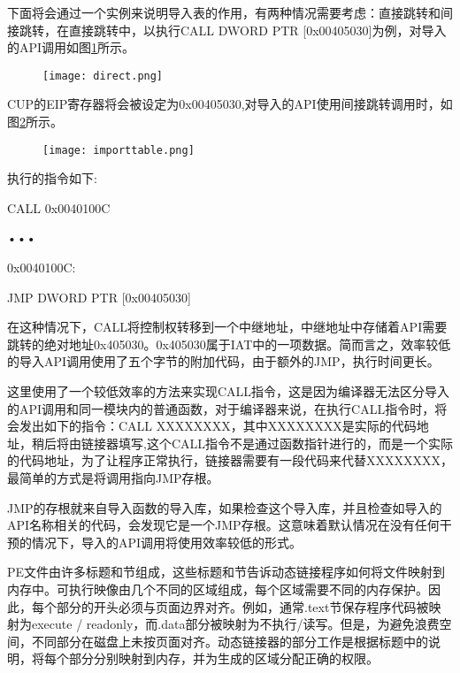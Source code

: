 下面将会通过一个实例来说明导入表的作用，有两种情况需要考虑：直接跳转和间接跳转，在直接跳转中，以执行CALL DWORD PTR [0x00405030]为例，对导入的API调用如图\ref{sec2:subsec3:direct}所示。

\begin{figure}[htbp]
	\centering
	\texttt{[image: direct.png]}\\
	\label{sec2:subsec3:direct}
\end{figure}

CUP的EIP寄存器将会被设定为0x00405030,对导入的API使用间接跳转调用时，如图\ref{sec2:subsec3:importtable}所示。

\begin{figure}[htbp]
	\centering
	\texttt{[image: importtable.png]}\\
	\label{sec2:subsec3:importtable}
\end{figure}

执行的指令如下:

CALL 0x0040100C

•••

0x0040100C:

JMP       DWORD PTR [0x00405030]

在这种情况下，CALL将控制权转移到一个中继地址，中继地址中存储着API需要跳转的绝对地址0x405030。0x405030属于IAT中的一项数据。简而言之，效率较低的导入API调用使用了五个字节的附加代码，由于额外的JMP，执行时间更长。

这里使用了一个较低效率的方法来实现CALL指令，这是因为编译器无法区分导入的API调用和同一模块内的普通函数，对于编译器来说，在执行CALL指令时，将会发出如下的指令：CALL XXXXXXXX，其中XXXXXXXX是实际的代码地址，稍后将由链接器填写,这个CALL指令不是通过函数指针进行的，而是一个实际的代码地址，为了让程序正常执行，链接器需要有一段代码来代替XXXXXXXX，最简单的方式是将调用指向JMP存根\cite{2016Building}。

JMP的存根就来自导入函数的导入库，如果检查这个导入库，并且检查如导入的API名称相关的代码，会发现它是一个JMP存根。这意味着默认情况在没有任何干预的情况下，导入的API调用将使用效率较低的形式\cite{2019The}。



PE文件由许多标题和节组成，这些标题和节告诉动态链接程序如何将文件映射到内存中。可执行映像由几个不同的区域组成，每个区域需要不同的内存保护。因此，每个部分的开头必须与页面边界对齐。例如，通常.text节保存程序代码被映射为execute / readonly，而.data部分被映射为不执行/读写。但是，为避免浪费空间，不同部分在磁盘上未按页面对齐。动态链接器的部分工作是根据标题中的说明，将每个部分分别映射到内存，并为生成的区域分配正确的权限。

